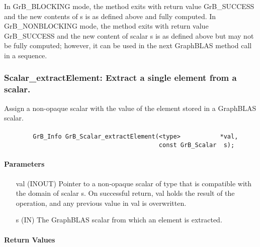 In {\sf GrB\_BLOCKING} mode, the method exits with return value 
{\sf GrB\_SUCCESS} and the new contents of {\sf s} is as defined above
and fully computed.  
In {\sf GrB\_NONBLOCKING} mode, the method exits with return value 
{\sf GrB\_SUCCESS} and the new content of scalar {\sf s} is as defined above 
but may not be fully computed; however, it can be used in the next GraphBLAS 
method call in a sequence.



\subsubsection{{\sf Scalar\_extractElement}: Extract a single element from a scalar.}
\label{Sec:Scalar_extractElement}

Assign a non-opaque scalar with the value of the element stored in a GraphBLAS scalar. 

\paragraph{\syntax}

\begin{verbatim}
        GrB_Info GrB_Scalar_extractElement(<type>           *val,
                                           const GrB_Scalar  s); 
\end{verbatim}

\paragraph{Parameters}

\begin{itemize}[leftmargin=1in]
    \item[{\sf val}]   ({\sf INOUT}) Pointer to a non-opaque scalar of type that is 
    compatible with the domain of scalar {\sf s}. On successful return, {\sf val} 
    holds the result of the operation, and any previous value in {\sf val} is 
    overwritten.

    \item[{\sf s}]     ({\sf IN}) The GraphBLAS scalar from which an element
    is extracted.
\end{itemize}

\paragraph{Return Values}

